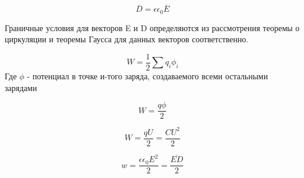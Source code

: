 \begin{equation}
\overline{D} = \epsilon \epsilon_0 \overline{E}
\end{equation}

Граничные условия для векторов E и D определяются из рассмотрения теоремы о циркуляции и теоремы Гаусса для данных векторов соответственно.


\begin{equation}
W = \frac{1}{2} \sum q_i \phi_i 
\end{equation}
Где $\phi$ - потенциал в точке и-того заряда, создаваемого всеми остальными зарядами

\begin{equation}
W = \frac{q\phi}{2}
\end{equation}

\begin{equation}
W = \frac{qU}{2} = \frac{C U^2}{2}
\end{equation}


\begin{equation}
w = \frac{\epsilon \epsilon_0 E^2}{2} = \frac{\overline{ED}}{2}
\end{equation}

